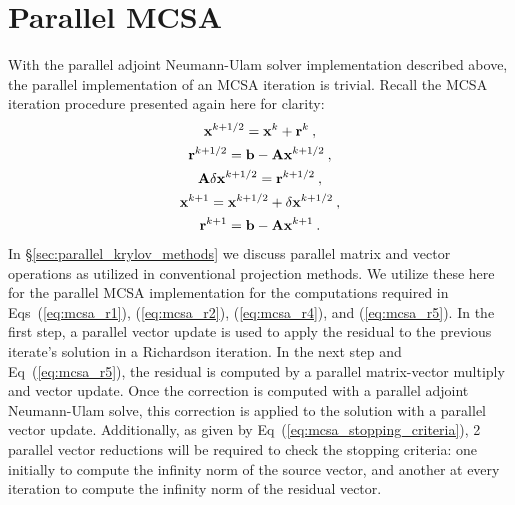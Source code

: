 \section{Parallel MCSA\ }
\label{sec:parallel_mcsa}
With the parallel adjoint Neumann-Ulam solver implementation described
above, the parallel implementation of an MCSA iteration is
trivial. Recall the MCSA iteration procedure presented again here for
clarity:
\begin{subequations}
  \begin{gather}
    \label{eq:mcsa_r1}
    \mathbf{x}^{k+1/2} = \mathbf{x}^k + \mathbf{r}^k\:,\\
    \label{eq:mcsa_r2}
    \mathbf{r}^{k+1/2} = \mathbf{b} - \mathbf{A}\mathbf{x}^{k+1/2}\:,\\
    \label{eq:mcsa_r3}
    \mathbf{A}\delta\mathbf{x}^{k+1/2} = \mathbf{r}^{k+1/2}\:,\\
    \label{eq:mcsa_r4}
    \mathbf{x}^{k+1} = \mathbf{x}^{k+1/2} + \delta \mathbf{x}^{k+1/2}\:,\\
    \label{eq:mcsa_r5}
    \mathbf{r}^{k+1} = \mathbf{b} - \mathbf{A}\mathbf{x}^{k+1}\:.
  \end{gather}
\end{subequations}
In \S\ref{sec:parallel_krylov_methods} we discuss parallel matrix and
vector operations as utilized in conventional projection methods. We
utilize these here for the parallel MCSA implementation for the
computations required in Eqs~(\ref{eq:mcsa_r1}), (\ref{eq:mcsa_r2}),
(\ref{eq:mcsa_r4}), and (\ref{eq:mcsa_r5}). In the first step, a
parallel vector update is used to apply the residual to the previous
iterate's solution in a Richardson iteration. In the next step and
Eq~(\ref{eq:mcsa_r5}), the residual is computed by a parallel
matrix-vector multiply and vector update. Once the correction is
computed with a parallel adjoint Neumann-Ulam solve, this correction
is applied to the solution with a parallel vector
update. Additionally, as given by
Eq~(\ref{eq:mcsa_stopping_criteria}), 2 parallel vector reductions
will be required to check the stopping criteria: one initially to
compute the infinity norm of the source vector, and another at every
iteration to compute the infinity norm of the residual vector.

